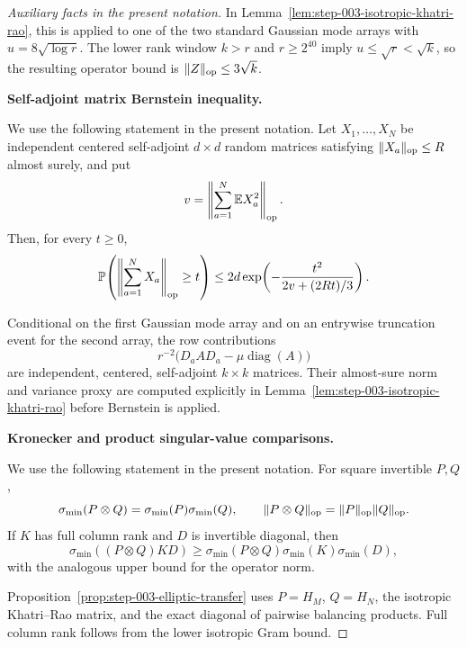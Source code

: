 \begin{proof}[Auxiliary facts in the present notation]
In
Lemma~\ref{lem:step-003-isotropic-khatri-rao}, this is applied to one of the
two standard Gaussian mode arrays with \(u=8\sqrt{\log r}\). The lower rank
window \(k>r\) and \(r\ge2^{40}\) imply
\(u\le\sqrt r<\sqrt k\), so the resulting operator bound is
\(\|Z\|_{\rm op}\le3\sqrt k\).


\medskip\noindent\textbf{Self-adjoint matrix Bernstein inequality.}\par

We use the following statement in the present notation. Let \(X_1,\ldots,X_N\) be independent centered
self-adjoint \(d\times d\) random matrices satisfying
\(\|X_a\|_{\rm op}\le R\) almost surely, and put
\[
  v=\left\|\sum_{a=1}^N\mathbb E X_a^2\right\|_{\rm op}.
\]
Then, for every \(t\ge0\),
\[
  \mathbb P\!\left(
    \left\|\sum_{a=1}^N X_a\right\|_{\rm op}\ge t
  \right)
  \le 2d\exp\!\left(-\frac{t^2}{2v+(2Rt)/3}\right).
\]

Conditional on the first Gaussian
mode array and on an entrywise truncation event for the second array, the
row contributions
\[
  r^{-2}\bigl(D_a A D_a-\mu\operatorname{diag}(A)\bigr)
\]
are independent, centered, self-adjoint \(k\times k\) matrices. Their
almost-sure norm and variance proxy are computed explicitly in
Lemma~\ref{lem:step-003-isotropic-khatri-rao} before Bernstein is applied.


\medskip\noindent\textbf{Kronecker and product singular-value comparisons.}\par

We use the following statement in the present notation. For square invertible \(P,Q\),
\[
  \sigma_{\min}(P\otimes Q)
    =\sigma_{\min}(P)\sigma_{\min}(Q),\qquad
  \|P\otimes Q\|_{\rm op}=\|P\|_{\rm op}\|Q\|_{\rm op}.
\]
If \(K\) has full column rank and \(D\) is invertible diagonal, then
\[
  \sigma_{\min}((P\otimes Q)KD)
  \ge\sigma_{\min}(P\otimes Q)\sigma_{\min}(K)\sigma_{\min}(D),
\]
with the analogous upper bound for the operator norm.

Proposition~\ref{prop:step-003-elliptic-transfer}
uses \(P=H_M\), \(Q=H_N\), the isotropic Khatri--Rao matrix, and the exact
diagonal of pairwise balancing products. Full column rank follows from the
lower isotropic Gram bound.

\end{proof}



